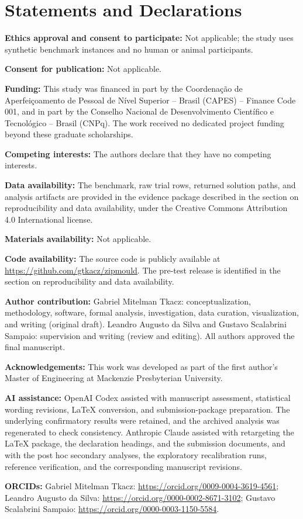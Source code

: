 \documentclass[pdflatex,sn-basic,iicol]{sn-jnl}
\newcommand{\orcidnote}{\textbf{ORCIDs:} Gabriel Mitelman Tkacz: \url{https://orcid.org/0009-0004-3619-4561}; Leandro Augusto da Silva: \url{https://orcid.org/0000-0002-8671-3102}; Gustavo Scalabrini Sampaio: \url{https://orcid.org/0000-0003-1150-5584}.}
\begin{document}
\section{Statements and Declarations}

\textbf{Ethics approval and consent to participate:} Not applicable; the study uses synthetic benchmark instances and no human or animal participants.

\textbf{Consent for publication:} Not applicable.

\textbf{Funding:} This study was financed in part by the Coordena\c{c}\~{a}o de Aperfei\c{c}oamento de Pessoal de N\'{i}vel Superior -- Brasil (CAPES) -- Finance Code 001, and in part by the Conselho Nacional de Desenvolvimento Cient\'{i}fico e Tecnol\'{o}gico -- Brasil (CNPq). The work received no dedicated project funding beyond these graduate scholarships.

\textbf{Competing interests:} The authors declare that they have no competing interests.

\textbf{Data availability:} The benchmark, raw trial rows, returned solution paths, and analysis artifacts are provided in the evidence package described in the section on reproducibility and data availability, under the Creative Commons Attribution 4.0 International license.

\textbf{Materials availability:} Not applicable.

\textbf{Code availability:} The source code is publicly available at \url{https://github.com/gtkacz/zipmould}. The pre-test release is identified in the section on reproducibility and data availability.

\textbf{Author contribution:} Gabriel Mitelman Tkacz: conceptualization, methodology, software, formal analysis, investigation, data curation, visualization, and writing (original draft). Leandro Augusto da Silva and Gustavo Scalabrini Sampaio: supervision and writing (review and editing). All authors approved the final manuscript.

\textbf{Acknowledgements:} This work was developed as part of the first author's Master of Engineering at Mackenzie Presbyterian University.

\textbf{AI assistance:} OpenAI Codex assisted with manuscript assessment, statistical wording revisions, LaTeX conversion, and submission-package preparation. The underlying confirmatory results were retained, and the archived analysis was regenerated to check consistency. Anthropic Claude assisted with retargeting the LaTeX package, the declaration headings, and the submission documents, and with the post hoc secondary analyses, the exploratory recalibration runs, reference verification, and the corresponding manuscript revisions.

\orcidnote


\end{document}
